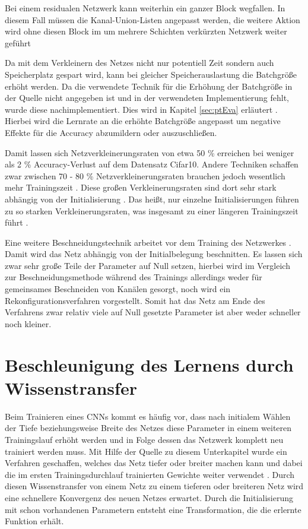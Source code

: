 Bei einem residualen Netzwerk kann weiterhin ein ganzer Block wegfallen. In diesem Fall müssen die Kanal-Union-Listen angepasst werden, die weitere Aktion wird ohne diesen Block im um mehrere Schichten verkürzten Netzwerk weiter geführt


Da mit dem Verkleinern des Netzes nicht nur potentiell Zeit sondern auch Speicherplatz gespart wird, kann bei gleicher Speicherauslastung die Batchgröße erhöht werden. Da die verwendete Technik für die Erhöhung der Batchgröße in der Quelle nicht angegeben ist und in der verwendeten Implementierung fehlt, wurde diese nachimplementiert. Dies wird in Kapitel \ref{sec:ptEva} erläutert \cite{ptImpl}. Hierbei wird die Lernrate an die erhöhte Batchgröße angepasst um negative Effekte für die Accuracy abzumildern oder auszuschließen. 

Damit lassen sich Netzverkleinerungsraten von etwa 50 \% erreichen bei weniger als 2 \% Accuracy-Verlust auf dem Datensatz Cifar10. Andere Techniken schaffen zwar zwischen 70 - 80 \% Netzverkleinerungsraten brauchen jedoch wesentlich mehr Trainingszeit \cite{lottery}. Diese großen Verkleinerungsraten sind dort sehr stark abhängig von der Initialisierung \cite{lottery}. Das heißt, nur einzelne Initialisierungen führen zu so starken Verkleinerungsraten, was insgesamt zu einer längeren Trainingszeit führt \cite{lottery}. 


Eine weitere Beschneidungstechnik arbeitet vor dem Training des Netzwerkes \cite{snyc}. Damit wird das Netz abhängig von der Initialbelegung beschnitten. Es lassen sich zwar sehr große Teile der Parameter auf Null setzen, hierbei wird im Vergleich zur Beschneidungsmethode während des Trainings allerdings weder für gemeinsames Beschneiden von Kanälen gesorgt, noch wird ein Rekonfigurationsverfahren vorgestellt. Somit hat das Netz am Ende des Verfahrens zwar relativ viele auf Null gesetzte Parameter ist aber weder schneller noch kleiner.


\section{Beschleunigung des Lernens durch Wissenstransfer}
\label{sec:net2net}
Beim Trainieren eines CNNs kommt es häufig vor, dass nach initialem Wählen der Tiefe beziehungsweise Breite des Netzes diese Parameter in einem weiteren Trainingslauf erhöht werden und in Folge dessen das Netzwerk komplett neu trainiert werden muss. Mit Hilfe der Quelle zu diesem Unterkapitel wurde ein Verfahren geschaffen, welches das Netz tiefer oder breiter machen kann und dabei die im ersten Trainingsdurchlauf trainierten Gewichte weiter verwendet \cite{net2net}. Durch diesen Wissenstransfer von einem Netz zu einem tieferen oder breiteren Netz wird eine schnellere Konvergenz des neuen Netzes erwartet. Durch die Initialisierung mit schon vorhandenen Parametern entsteht eine Transformation, die die erlernte Funktion erhält.

